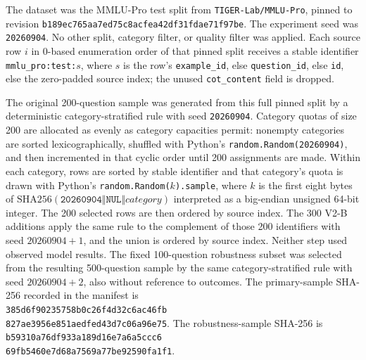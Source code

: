 The dataset was the MMLU-Pro test split from
\texttt{TIGER-Lab/MMLU-Pro}, pinned to revision
\texttt{b189ec765aa7ed75c8acfea42df31fdae71f97be}. The experiment seed was
\texttt{20260904}. No other split, category filter, or quality filter was
applied. Each source row $i$ in 0-based enumeration order of that pinned
split receives a stable identifier \texttt{mmlu\_pro:test:}$s$, where $s$ is
the row's \texttt{example\_id}, else \texttt{question\_id}, else \texttt{id},
else the zero-padded source index; the unused \texttt{cot\_content} field is
dropped.

The original 200-question sample was generated from this full pinned split by
a deterministic category-stratified rule with seed \texttt{20260904}.
Category quotas of size 200 are allocated as evenly as category capacities
permit: nonempty categories are sorted lexicographically, shuffled with
Python's \texttt{random.Random(20260904)}, and then incremented in that
cyclic order until 200 assignments are made. Within each category, rows are
sorted by stable identifier and that category's quota is drawn with
Python's \texttt{random.Random($k$).sample}, where $k$ is the first eight
bytes of
$\mathrm{SHA256}(\texttt{20260904}\Vert \mathtt{NUL}\Vert \textit{category})$
interpreted as a big-endian unsigned 64-bit integer. The 200 selected rows
are then ordered by source index. The 300 V2-B additions apply the same rule
to the complement of those 200 identifiers with seed $20260904+1$, and the
union is ordered by source index. Neither step used observed model results.
The fixed 100-question robustness subset was selected from the resulting
500-question sample by the same category-stratified rule with seed
$20260904+2$, also without reference to outcomes. The primary-sample SHA-256
recorded in the manifest is\\
\texttt{385d6f90235758b0c26f4d32c6ac46fb}\\
\texttt{827ae3956e851aedfed43d7c06a96e75}. The robustness-sample SHA-256 is\\
\texttt{b59310a76df933a189d16e7a6a5ccc6}\\
\texttt{69fb5460e7d68a7569a77be92590fa1f1}.

